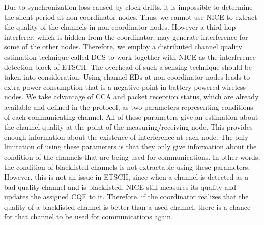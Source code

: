 \documentclass[acmsmall, authorversion]{acmart}
\begin{document}
Due to synchronization loss caused by clock drifts, it is impossible to determine the silent period at non-coordinator nodes. Thus, we cannot use NICE to extract the quality of the channels in non-coordinator nodes. However a third hop interferer, which is hidden from the coordinator, may generate interference for some of the other nodes. Therefore, we employ a distributed channel quality estimation technique called DCS to work together with NICE as the interference detection block of ETSCH. The overhead of such a sensing technique should be taken into consideration. Using channel EDs at non-coordinator nodes \citep{de} leads to extra power consumption that is a negative point in battery-powered wireless nodes. We take advantage of CCA and packet reception status, which are already available and defined in the protocol, as two parameters representing conditions of each communicating channel. All of these parameters give an estimation about the channel quality at the point of the measuring/receiving node. This provides enough information about the existence of interference at each node. The only limitation of using these parameters is that they only give information about the condition of the channels that are being used for communications. In other words, the condition of blacklisted channels is not extractable using these parameters. However, this is not an issue in ETSCH, since when a channel is detected as a bad-quality channel and is blacklisted, NICE still measures its quality and updates the assigned CQE to it. Therefore, if the coordinator realizes that the quality of a blacklisted channel is better than a used channel, there is a chance for that channel to be used for communications again.
\end{document}
